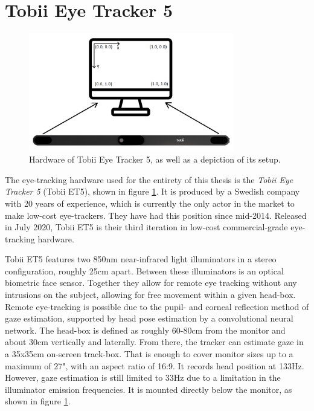 \section{Tobii Eye Tracker 5} \label{sec:hwds_TobiiEyeTracker5}

\begin{figure}[h]
    \centering
    \includegraphics[width=0.8\textwidth]{Images/hwds_hardware.png}
    \caption{Hardware of Tobii Eye Tracker 5, as well as a depiction of its setup.}
    \label{fig:hwds_hardware}
\end{figure}

The eye-tracking hardware used for the entirety of this thesis is the \textit{Tobii Eye Tracker 5} (Tobii ET5), shown in figure \ref{fig:hwds_hardware}. It is produced by a Swedish company with 20 years of experience, which is currently the only actor in the market to make low-cost eye-trackers. They have had this position since mid-2014. Released in July 2020, Tobii ET5 is their third iteration in low-cost commercial-grade eye-tracking hardware.

Tobii ET5 features two 850nm near-infrared light illuminators in a stereo configuration, roughly 25cm apart. Between these illuminators is an optical biometric face sensor. Together they allow for remote eye tracking without any intrusions on the subject, allowing for free movement within a given head-box. Remote eye-tracking is possible due to the pupil- and corneal reflection method of gaze estimation, supported by head pose estimation by a convolutional neural network. The head-box is defined as roughly 60-80cm from the monitor and about 30cm vertically and laterally. From there, the tracker can estimate gaze in a 35x35cm on-screen track-box. That is enough to cover monitor sizes up to a maximum of 27", with an aspect ratio of 16:9. It records head position at 133Hz. However, gaze estimation is still limited to 33Hz due to a limitation in the illuminator emission frequencies. It is mounted directly below the monitor, as shown in figure \ref{fig:hwds_hardware}.

